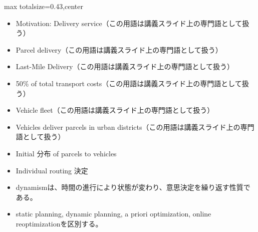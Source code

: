 \clearpage
{}
\begin{minipage}[t]{0.405\textwidth}
\begin{adjustbox}{max totalsize={\textwidth}{0.43\textheight},center}
\begin{minipage}{\textwidth}\scriptsize
{}\begin{itemize}
\item Motivation: Delivery service（この用語は講義スライド上の専門語として扱う）
\item Parcel delivery（この用語は講義スライド上の専門語として扱う）
\item Last-Mile Delivery（この用語は講義スライド上の専門語として扱う）
\item 50\% of total transport costs（この用語は講義スライド上の専門語として扱う）
\item Vehicle fleet（この用語は講義スライド上の専門語として扱う）
\item Vehicles deliver parcels in urban districts（この用語は講義スライド上の専門語として扱う）
\item Initial 分布 of parcels to vehicles
\item Individual routing 決定
\end{itemize}\begin{itemize}
\item dynamismは、時間の進行により状態が変わり、意思決定を繰り返す性質である。
\item static planning, dynamic planning, a priori optimization, online reoptimizationを区別する。
\end{itemize}
\end{minipage}
\end{adjustbox}
\end{minipage}\hfill
